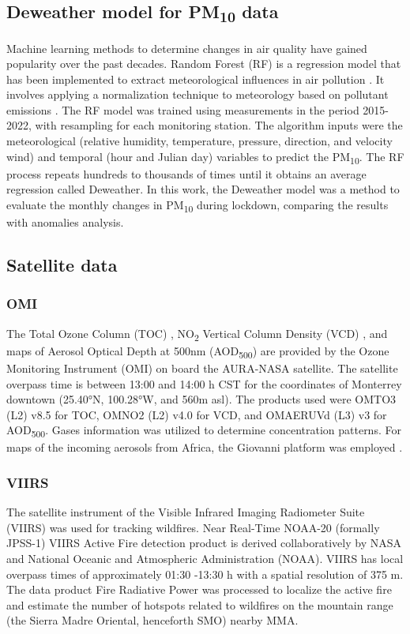 \documentclass[sn-mathphys-num]{sn-jnl}
\begin{document}
\subsection{Deweather model for PM\textsubscript{10} data}
Machine learning methods to determine changes in air quality have gained popularity over the past decades. Random Forest (RF) is a regression model that has been implemented to extract meteorological influences in air pollution \citep{Breiman_2001,Vu_2019,Cole_2020}. It involves applying a normalization technique to meteorology based on pollutant emissions  \citep{Stuart_2019,Zongbo_2021,Lv_2022}. The RF model was trained using measurements in the period 2015-2022, with resampling for each monitoring station. The algorithm inputs were the meteorological (relative humidity, temperature, pressure, direction, and velocity wind) and temporal (hour and Julian day) variables to predict the PM\textsubscript{10}. The RF process repeats hundreds to thousands of times until it obtains an average regression called Deweather. In this work, the Deweather model was a method to evaluate the monthly changes in PM\textsubscript{10} during lockdown, comparing the results with anomalies analysis.
\subsection{Satellite data}
\subsubsection{OMI}
The Total Ozone Column (TOC) \citep{dcio}, NO\textsubscript{2} Vertical Column Density (VCD) \citep{Lamsal_2020}, and maps of Aerosol Optical Depth at 500nm (AOD\textsubscript{500}) are provided by the Ozone Monitoring Instrument (OMI) on board the AURA-NASA satellite. The satellite overpass time is between 13:00 and 14:00 h CST for the coordinates of Monterrey downtown (25.40°N, 100.28°W, and 560m asl). The products used were OMTO3 (L2) v8.5 for TOC, OMNO2 (L2) v4.0 for VCD, and OMAERUVd (L3) v3 for AOD\textsubscript{500}. Gases information was utilized to determine concentration patterns. For maps of the incoming aerosols from Africa, the Giovanni platform was employed \citep{torres2008}.
\subsubsection{VIIRS}
The satellite instrument of the Visible Infrared Imaging Radiometer Suite (VIIRS) \citep{Schroeder_2014} was used for tracking wildfires. Near Real-Time NOAA-20 (formally JPSS-1) VIIRS Active Fire detection product is derived collaboratively by NASA and National Oceanic and Atmospheric Administration (NOAA). VIIRS has local overpass times of approximately 01:30 -13:30 h with a spatial resolution of 375 m. The data product Fire Radiative Power \citep{earthdata} was processed to localize the active fire and estimate the number of hotspots related to wildfires on the mountain range (the Sierra Madre Oriental, henceforth SMO) nearby MMA.
\end{document}

